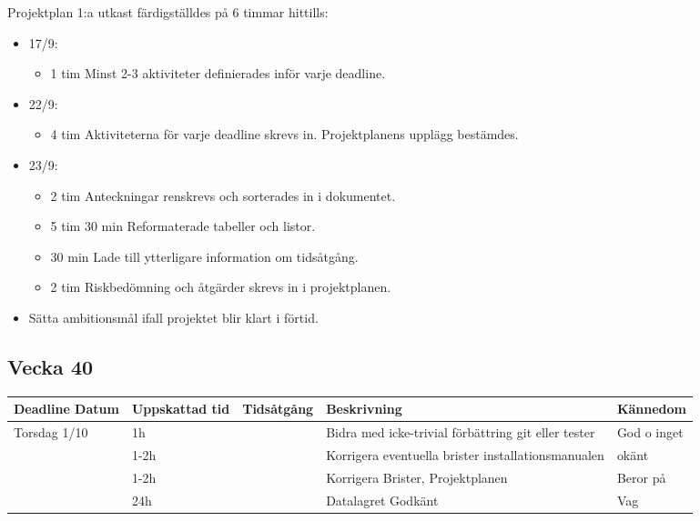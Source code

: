 \documentclass{TDP003mall}
\begin{document}
	Projektplan 1:a utkast färdigställdes på 6 timmar hittills:
\begin{itemize}
	\item 17/9:
	\begin{itemize}
		\item 1 tim Minst 2-3 aktiviteter definierades inför varje deadline.
	\end{itemize}
	\item 22/9:
	\begin{itemize}
		\item 4 tim Aktiviteterna för varje deadline skrevs in. Projektplanens upplägg bestämdes.
	\end{itemize}
	\item 23/9:
	\begin{itemize}
		\item 2 tim Anteckningar renskrevs och sorterades in i dokumentet.
		\item 5 tim 30 min Reformaterade tabeller och listor.
		\item 30 min Lade till ytterligare information om tidsåtgång.
                \item 2 tim Riskbedömning och åtgärder skrevs in i projektplanen.
	\end{itemize}
	\item Sätta ambitionsmål ifall projektet blir klart i förtid.
	
\end{itemize}

\subsection{Vecka 40}
\begin{tabularx}{\linewidth}{|l|l|l|X|l|}
	\hline
	Deadline Datum & Uppskattad tid & Tidsåtgång & Beskrivning                                         & Kännedom    \\ [0.5ex]
	\hline
	Torsdag 1/10   & 1h             &            & Bidra med icke-trivial förbättring git eller tester & God o inget \\
	\hline
                   & 1-2h           &            & Korrigera eventuella brister installationsmanualen  & okänt       \\
	\hline
                   & 1-2h           &            & Korrigera Brister, Projektplanen                    & Beror på    \\
	\hline
                   & 24h            &            & Datalagret Godkänt                                  & Vag         \\
	\hline
\end{tabularx}
\end{document}
